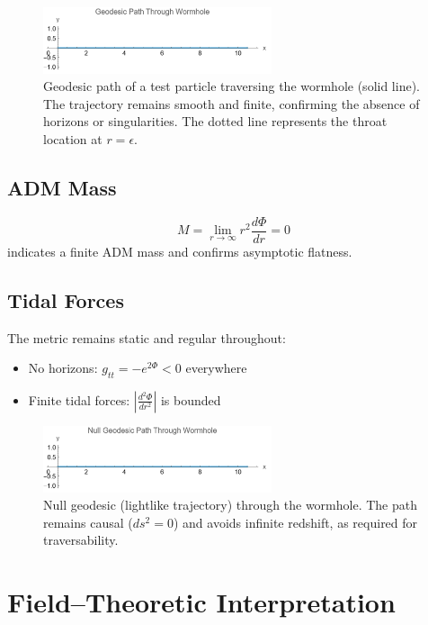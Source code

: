 \documentclass[12pt]{article}
\begin{document}
\begin{figure}[htbp]
    \centering
    \includegraphics[width=0.6\textwidth]{GeodesicPath.png}
    \caption{Geodesic path of a test particle traversing the wormhole (solid line). The trajectory remains smooth and finite, confirming the absence of horizons or singularities. The dotted line represents the throat location at \( r = \epsilon \).}
    \label{fig:geodesic}
\end{figure}

\subsection{ADM Mass}
\[
M = \lim_{r \to \infty} r^2 \frac{d\Phi}{dr} = 0
\]
indicates a finite ADM mass and confirms asymptotic flatness.

\subsection{Tidal Forces}
The metric remains static and regular throughout:
\begin{itemize}
  \item No horizons: \( g_{tt} = -e^{2\Phi} < 0 \) everywhere
  \item Finite tidal forces: \( \left| \frac{d^2\Phi}{dr^2} \right| \) is bounded
\end{itemize}

\begin{figure}[htbp]
    \centering
    \includegraphics[width=0.6\textwidth]{NullGeodesicPath.png}
    \caption{Null geodesic (lightlike trajectory) through the wormhole. The path remains causal (\( ds^2 = 0 \)) and avoids infinite redshift, as required for traversability.}
    \label{fig:nullgeodesic}
\end{figure}

\section{Field–Theoretic Interpretation}
\label{sec:field_theory}
\end{document}
